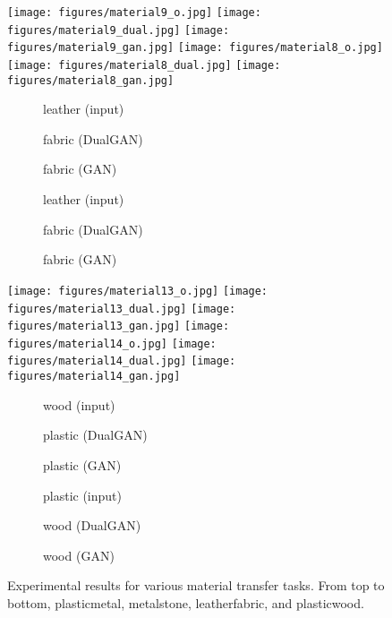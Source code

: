 \begin{figure*}
\begin{center}
\texttt{[image: figures/material9\_o.jpg]}
\texttt{[image: figures/material9\_dual.jpg]}
\texttt{[image: figures/material9\_gan.jpg]}
\texttt{[image: figures/material8\_o.jpg]}
\texttt{[image: figures/material8\_dual.jpg]}
\texttt{[image: figures/material8\_gan.jpg]}

\begin{subfigure}[]{0.13\linewidth}\caption*{leather (input)}\end{subfigure}
\begin{subfigure}[]{0.14\linewidth}\caption*{fabric (DualGAN)}\end{subfigure}
\begin{subfigure}[]{0.13\linewidth}\caption*{fabric (GAN)}\end{subfigure}
\begin{subfigure}[]{0.13\linewidth}\caption*{leather (input)}\end{subfigure}
\begin{subfigure}[]{0.14\linewidth}\caption*{fabric (DualGAN)}\end{subfigure}
\begin{subfigure}[]{0.13\linewidth}\caption*{fabric (GAN)}\end{subfigure}

\texttt{[image: figures/material13\_o.jpg]}
\texttt{[image: figures/material13\_dual.jpg]}
\texttt{[image: figures/material13\_gan.jpg]}
\texttt{[image: figures/material14\_o.jpg]}
\texttt{[image: figures/material14\_dual.jpg]}
\texttt{[image: figures/material14\_gan.jpg]}

\begin{subfigure}[]{0.13\linewidth}\caption*{wood (input)}\end{subfigure}
\begin{subfigure}[]{0.15\linewidth}\caption*{plastic (DualGAN)}\end{subfigure}
\begin{subfigure}[]{0.13\linewidth}\caption*{plastic (GAN)}\end{subfigure}
\begin{subfigure}[]{0.13\linewidth}\caption*{plastic (input)}\end{subfigure}
\begin{subfigure}[]{0.14\linewidth}\caption*{wood (DualGAN)}\end{subfigure}
\begin{subfigure}[]{0.13\linewidth}\caption*{wood (GAN)}\end{subfigure}
\caption{Experimental results for various material transfer tasks. From top to bottom, 
plasticmetal, metalstone, leatherfabric, and 
plasticwood.} \label{fig:material}
\end{center}
\end{figure*}


